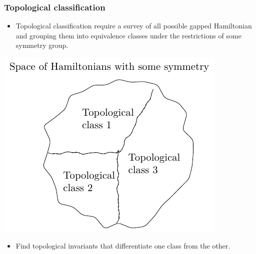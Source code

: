 \documentclass{beamer}
\renewcommand{\(}{\left(}
\renewcommand{\)}{\right)}
\renewcommand{\[}{\left[}
\renewcommand{\]}{\right]}
\begin{document}
\begin{frame}
    \frametitle{Topological classification}

    \begin{itemize}
        \item Topological classification require a survey of all possible gapped Hamiltonian and grouping them into equivalence classes under the restrictions of some symmetry group. 
    \end{itemize}
    \centering
    \includegraphics[]{hams_space.pdf}
    \begin{itemize}
        \item Find topological invariants that differentiate one class from the other. 
    \end{itemize}


\end{frame}
\end{document}
